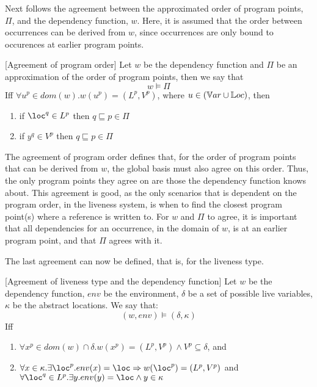 \documentclass[../../master.tex]{subfiles}
\begin{document}
Next follows the agreement between the approximated order of program points, $\Pi$, and the dependency function, $w$.
Here, it is assumed that the order between occurrences can be derived from $w$, since occurrences are only bound to occurences at earlier program points.

\begin{definition}{[Agreement of program order]}
	Let $w$ be the dependency function and $\Pi$ be an approximation of the order of program points, then we say that
	$$w\models\Pi$$
	Iff $\forall u^p\in dom(w).w(u^p)=(L^p,V^p)$, where $u\in(\mathbb{V}ar\cup\mathbb{L}oc)$, then
	\begin{enumerate}
		\item if $\loc^q\in L^p$ then $q\sqsubseteq p\in\Pi$
		\item if $y^q\in V^p$ then $q\sqsubseteq p\in\Pi$
	\end{enumerate}
\end{definition}

The agreement of program order defines that, for the order of program points that can be derived from $w$, the global basis must also agree on this order.
Thus, the only program points they agree on are those the dependency function knows about.
This agreement is good, as the only scenarios that is dependent on the program order, in the liveness system, is when to find the closest program point(s) where a reference is written to.
For $w$ and $\Pi$ to agree, it is important that all dependencies for an occurrence, in the domain of $w$, is at an earlier program point, and that $\Pi$ agrees with it.
\bigskip

The last agreement can now be defined, that is, for the liveness type.

\begin{definition}{[Agreement of liveness type and the dependency function]}
	Let $w$ be the dependency function, $env$ be the environment, $\delta$ be a set of possible live variables, $\kappa$ be the abstract locations.
	We say that:
	$$(w,env)\models(\delta,\kappa)$$
	Iff
	\begin{enumerate}
		\item $\forall x^p\in dom(w)\cap\delta. w(x^p)=(L^p,V^p)\wedge V^p\subseteq\delta$, and
		\item $\forall x\in\kappa.\exists \loc^p.env(x)=\loc \Rightarrow  w(\loc^p)=(L^p,V^p)$ and $\forall\loc^q\in L^p.\exists y.env(y)=\loc\wedge y\in\kappa$
	\end{enumerate}
\end{definition}
\end{document}
